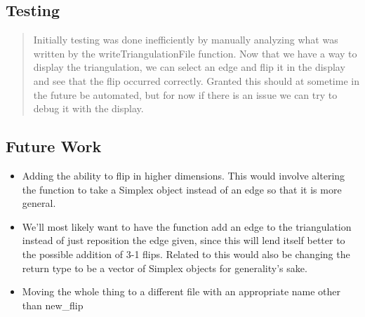 \subsection*{Testing}

\begin{quotation}
Initially testing was done inefficiently by manually analyzing what was
written by the writeTriangulationFile function. Now that we have a way to
display the triangulation, we can select an edge and flip it in the display
and see that the flip occurred correctly. Granted this should at sometime in
the future be automated, but for now if there is an issue we can try to
debug it with the display.
\end{quotation}

\subsection*{Future Work}

\begin{itemize}
\item Adding the ability to flip in higher dimensions. This would involve
altering the function to take a Simplex object instead of an edge so that it
is more general.

\item We'll most likely want to have the function add an edge to the
triangulation instead of just reposition the edge given, since this will
lend itself better to the possible addition of 3-1 flips. Related to this
would also be changing the return type to be a vector of Simplex objects for
generality's sake.

\item Moving the whole thing to a different file with an appropriate name
other than new\_flip
\end{itemize}


%
